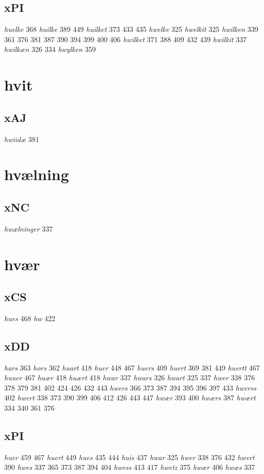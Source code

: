 \documentclass[a4paper,twocolumn]{article}
\begin{document}
\subsection{xPI}
\label{sec:org63bacc5}
\emph{huelke} 368 \emph{huilke} 389 449 \emph{huilket} 373 433 435 \emph{hwelke} 325 \emph{hwelkit} 325 \emph{hwilken} 339 361 376 381 387 390 394 399 400 406 \emph{hwilket} 371 388 409 432 439 \emph{hwilkit} 337 \emph{hwilkæn} 326 334 \emph{hwylken} 359 
\section{hvit}
\label{sec:org7b5e817}
\subsection{xAJ}
\label{sec:org5dc931f}
\emph{hwiidæ} 381 
\section{hvælning}
\label{sec:org2a58acb}
\subsection{xNC}
\label{sec:org2b16137}
\emph{hwælninger} 337 
\section{hvær}
\label{sec:org5352415}
\subsection{xCS}
\label{sec:org6c0c69a}
\emph{hues} 468 \emph{hw} 422 
\subsection{xDD}
\label{sec:org30a4a7d}
\emph{hars} 363 \emph{hors} 362 \emph{huart} 418 \emph{huer} 448 467 \emph{huers} 409 \emph{huert} 369 381 449 \emph{huertt} 467 \emph{huuer} 467 \emph{huær} 418 \emph{huært} 418 \emph{hwar} 337 \emph{hwars} 326 \emph{hwart} 325 337 \emph{hwer} 338 376 378 379 381 402 424 426 432 443 \emph{hwers} 366 373 387 394 395 396 397 433 \emph{hwerss} 402 \emph{hwert} 338 373 390 399 406 412 426 443 447 \emph{hwær} 393 400 \emph{hwærs} 387 \emph{hwært} 334 340 361 376 
\subsection{xPI}
\label{sec:orgffedda7}
\emph{huer} 459 467 \emph{huert} 449 \emph{hues} 435 444 \emph{huis} 437 \emph{hwar} 325 \emph{hwer} 338 376 432 \emph{hwert} 390 \emph{hwes} 337 365 373 387 394 404 \emph{hwess} 413 417 \emph{hwetz} 375 \emph{hwær} 406 \emph{hwæs} 337 
\end{document}
